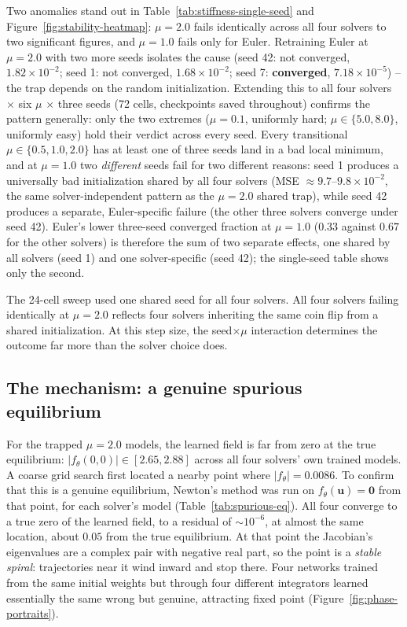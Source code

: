 Two anomalies stand out in Table~\ref{tab:stiffness-single-seed} and
Figure~\ref{fig:stability-heatmap}: $\mu=2.0$ fails identically across all
four solvers to two significant figures, and $\mu=1.0$ fails only for Euler.
Retraining Euler at $\mu=2.0$ with two more seeds isolates the cause (seed 42:
not converged, $1.82\times10^{-2}$; seed 1: not converged,
$1.68\times10^{-2}$; seed 7:
\textbf{converged}, $7.18\times10^{-5}$) -- the trap depends on the random
initialization. Extending this to all four solvers $\times$ six $\mu$
$\times$ three seeds (72 cells, checkpoints saved throughout) confirms the
pattern generally: only the two extremes ($\mu=0.1$, uniformly hard;
$\mu\in\{5.0,8.0\}$, uniformly easy) hold their verdict across every seed.
Every transitional $\mu\in\{0.5,1.0,2.0\}$ has at least one of three seeds
land in a bad local minimum, and at $\mu=1.0$ two \emph{different} seeds fail
for two different reasons: seed 1 produces a universally bad initialization
shared by all four solvers (MSE $\approx9.7\text{--}9.8\times10^{-2}$, the
same solver-independent pattern as the $\mu=2.0$ shared trap), while seed 42
produces a separate, Euler-specific failure (the other three solvers converge
under seed 42). Euler's lower three-seed converged fraction at $\mu=1.0$
($0.33$ against $0.67$ for the other solvers) is therefore the sum of two
separate effects, one shared by all solvers (seed 1) and one solver-specific
(seed 42); the single-seed table shows only the second.

\begin{keypoint}
The 24-cell sweep used one shared seed for all four solvers. All four solvers
failing identically at $\mu=2.0$ reflects four solvers inheriting the same
coin flip from a shared initialization. At this step size, the
seed$\times\mu$ interaction determines the outcome far more than the solver
choice does.
\end{keypoint}

\subsection{The mechanism: a genuine spurious equilibrium}

For the trapped $\mu=2.0$ models, the learned field is far from zero at the
true equilibrium: $|f_\theta(0,0)|\in[2.65,2.88]$ across all four solvers'
own trained models. A coarse grid search first located a nearby point where
$|f_\theta|=0.0086$. To confirm that this is a genuine equilibrium, Newton's
method was run on $f_\theta(\mathbf u)=\mathbf 0$ from that point, for each
solver's model (Table~\ref{tab:spurious-eq}). All four converge to a true
zero of the learned field, to a residual of $\sim10^{-6}$, at almost the same
location, about $0.05$ from the true equilibrium. At that point the
Jacobian's eigenvalues are a complex pair with negative real part, so the
point is a \emph{stable spiral}: trajectories near it wind inward and stop
there. Four networks trained from the same initial weights but through four
different integrators learned essentially the same wrong but genuine,
attracting fixed point (Figure~\ref{fig:phase-portraits}).

